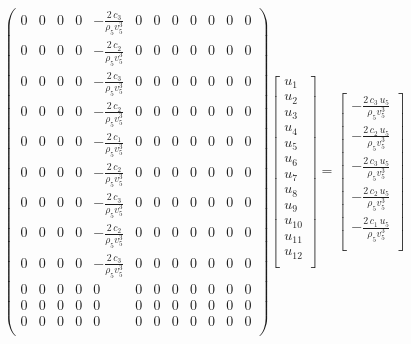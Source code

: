 \documentclass[revised,endfloat]{geophysics}
\begin{document}
\begin{equation}
\begin{pmatrix}
0 & 0 & 0 & 0 & -\frac{2\, c_3}{\rho_5 v_5^3} & 0 & 0 & 0 & 0 & 0 & 0 & 0 \\
0 & 0 & 0 & 0 & -\frac{2\, c_2}{\rho_5 v_5^3} & 0 & 0 & 0 & 0 & 0 & 0 & 0 \\
0 & 0 & 0 & 0 & -\frac{2\, c_3}{\rho_5 v_5^3} & 0 & 0 & 0 & 0 & 0 & 0 & 0 \\
0 & 0 & 0 & 0 & -\frac{2\, c_2}{\rho_5 v_5^3} & 0 & 0 & 0 & 0 & 0 & 0 & 0 \\
0 & 0 & 0 & 0 & -\frac{2\, c_1}{\rho_5 v_5^3} & 0 & 0 & 0 & 0 & 0 & 0 & 0 \\
0 & 0 & 0 & 0 & -\frac{2\, c_2}{\rho_5 v_5^3} & 0 & 0 & 0 & 0 & 0 & 0 & 0 \\
0 & 0 & 0 & 0 & -\frac{2\, c_3}{\rho_5 v_5^3} & 0 & 0 & 0 & 0 & 0 & 0 & 0 \\
0 & 0 & 0 & 0 & -\frac{2\, c_2}{\rho_5 v_5^3} & 0 & 0 & 0 & 0 & 0 & 0 & 0 \\
0 & 0 & 0 & 0 & -\frac{2\, c_3}{\rho_5 v_5^3} & 0 & 0 & 0 & 0 & 0 & 0 & 0 \\
0 & 0 & 0 & 0 & 0 & 0 & 0 & 0 & 0 & 0 & 0 & 0 \\
0 & 0 & 0 & 0 & 0 & 0 & 0 & 0 & 0 & 0 & 0 & 0 \\
0 & 0 & 0 & 0 & 0 & 0 & 0 & 0 & 0 & 0 & 0 & 0 \\
\end{pmatrix}
\begin{bmatrix}
u_1\\
u_2\\
u_3\\
u_4\\
u_5\\
u_6\\
u_7\\
u_8\\
u_9\\
u_{10}\\
u_{11}\\
u_{12}\\
\end{bmatrix}
=
\begin{bmatrix}
-\frac{2\, c_3\, u_5}{\rho_5 v_5^3} \\
-\frac{2\, c_2\, u_5}{\rho_5 v_5^3} \\
-\frac{2\, c_3\, u_5}{\rho_5 v_5^3} \\
-\frac{2\, c_2\, u_5}{\rho_5 v_5^3} \\
-\frac{2\, c_1\, u_5}{\rho_5 v_5^3} \\

\end{bmatrix}
\end{equation}
\end{document}
